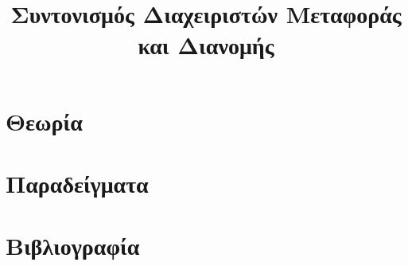 \title{Συντονισμός Διαχειριστών Μεταφοράς και Διανομής}

\section{Θεωρία}
\label{kef-07-theoria}

\section{Παραδείγματα}
\label{kef-07-paradeigmata}

\section{Βιβλιογραφία}
\label{kef-07-vivliografia}
